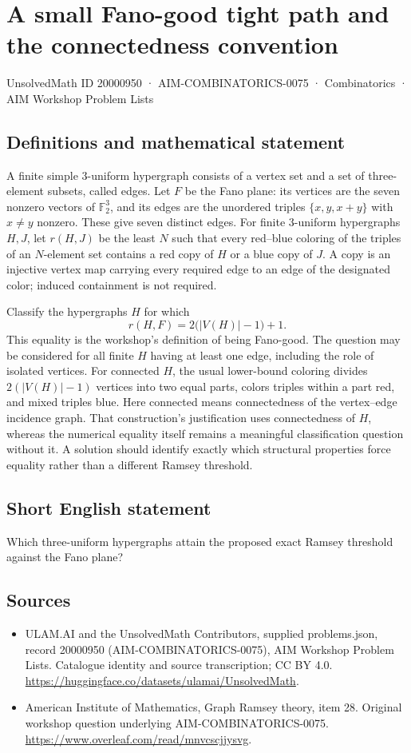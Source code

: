 \documentclass[11pt,a4paper]{article}
\begin{document}
\section*{A small Fano-good tight path and the connectedness convention}\label{20000950}
{\small UnsolvedMath ID 20000950 · AIM-COMBINATORICS-0075 · Combinatorics · AIM Workshop Problem Lists}
\subsection{Definitions and mathematical statement}
A finite simple $3$-uniform hypergraph consists of a vertex set and a set of three-element subsets, called edges.
Let $F$ be the Fano plane: its vertices are the seven nonzero vectors of $\mathbb F_2^3$, and its edges are the unordered triples $\{x,y,x+y\}$ with $x\ne y$ nonzero.
These give seven distinct edges.
For finite $3$-uniform hypergraphs $H,J$, let $r(H,J)$ be the least $N$ such that every red--blue coloring of the triples of an $N$-element set contains a red copy of $H$ or a blue copy of $J$.
A copy is an injective vertex map carrying every required edge to an edge of the designated color; induced containment is not required.

Classify the hypergraphs $H$ for which
\[
 r(H,F)=2\bigl(|V(H)|-1\bigr)+1.
\]
This equality is the workshop's definition of being Fano-good.
The question may be considered for all finite $H$ having at least one edge, including the role of isolated vertices.
For connected $H$, the usual lower-bound coloring divides $2(|V(H)|-1)$ vertices into two equal parts, colors triples within a part red, and mixed triples blue.
Here connected means connectedness of the vertex--edge incidence graph.
That construction's justification uses connectedness of $H$, whereas the numerical equality itself remains a meaningful classification question without it.
A solution should identify exactly which structural properties force equality rather than a different Ramsey threshold.
\subsection{Short English statement}
Which three-uniform hypergraphs attain the proposed exact Ramsey threshold against the Fano plane?
\subsection{Sources}
\begin{itemize}
\item[S1] ULAM.AI and the UnsolvedMath Contributors, supplied problems.json, record 20000950 (AIM-COMBINATORICS-0075), AIM Workshop Problem Lists. Catalogue identity and source transcription; CC BY 4.0.
\url{https://huggingface.co/datasets/ulamai/UnsolvedMath}.
\item[S2] American Institute of Mathematics, Graph Ramsey theory, item 28. Original workshop question underlying AIM-COMBINATORICS-0075.
\url{https://www.overleaf.com/read/mnvcscjjysvg}.
\end{itemize}
\end{document}
